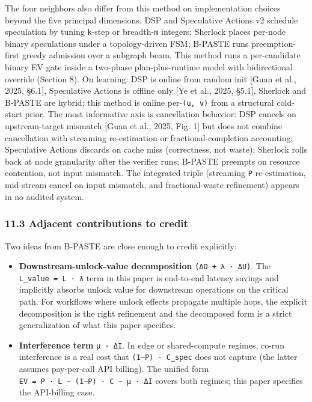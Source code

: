 \documentclass[
  11pt,
]{article}
\providecommand{\tightlist}{%
  \setlength{\itemsep}{0pt}\setlength{\parskip}{0pt}}
\begin{document}
The four neighbors also differ from this method on implementation
choices beyond the five principal dimensions. DSP and Speculative
Actions v2 schedule speculation by tuning \texttt{k}-step or
breadth-\texttt{m} integers; Sherlock places per-node binary
speculations under a topology-driven FSM; B-PASTE runs preemption-first
greedy admission over a subgraph beam. This method runs a per-candidate
binary EV gate inside a two-phase plan-plus-runtime model with
bidirectional override (Section 8). On learning: DSP is online from
random init {[}Guan et al., 2025, §6.1{]}, Speculative Actions is
offline only {[}Ye et al., 2025, §5.1{]}, Sherlock and B-PASTE are
hybrid; this method is online per-\texttt{(u,\ v)} from a structural
cold-start prior. The most informative axis is cancellation behavior:
DSP cancels on upstream-target mismatch {[}Guan et al., 2025, Fig. 1{]}
but does not combine cancellation with streaming re-estimation or
fractional-completion accounting; Speculative Actions discards on cache
miss (correctness, not waste); Sherlock rolls back at node granularity
after the verifier runs; B-PASTE preempts on resource contention, not
input mismatch. The integrated triple (streaming \texttt{P}
re-estimation, mid-stream cancel on input mismatch, and fractional-waste
refinement) appears in no audited system.

\subsubsection{11.3 Adjacent contributions to
credit}\label{adjacent-contributions-to-credit}

Two ideas from B-PASTE are close enough to credit explicitly:

\begin{itemize}
\tightlist
\item
  \textbf{Downstream-unlock-value decomposition}
  \texttt{(ΔO\ +\ λ\ ·\ ΔU)}. The \texttt{L\_value\ =\ L\ ·\ λ} term in
  this paper is end-to-end latency savings and implicitly absorbs unlock
  value for downstream operations on the critical path. For workflows
  where unlock effects propagate multiple hops, the explicit
  decomposition is the right refinement and the decomposed form is a
  strict generalization of what this paper specifies.
\item
  \textbf{Interference term} \texttt{µ\ ·\ ΔI}. In edge or
  shared-compute regimes, co-run interference is a real cost that
  \texttt{(1−P)\ ·\ C\_spec} does not capture (the latter assumes
  pay-per-call API billing). The unified form
  \texttt{EV\ =\ P\ ·\ L\ −\ (1−P)\ ·\ C\ −\ µ\ ·\ ΔI} covers both
  regimes; this paper specifies the API-billing case.
\end{itemize}
\end{document}

